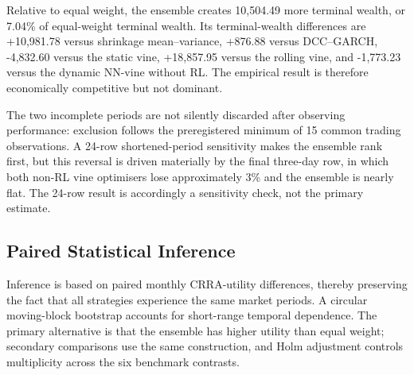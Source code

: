 Relative to equal weight, the ensemble creates 10,504.49 more terminal wealth, or 7.04\% of equal-weight terminal wealth. Its terminal-wealth differences are +10,981.78 versus shrinkage mean--variance, +876.88 versus DCC--GARCH, -4,832.60 versus the static vine, +18,857.95 versus the rolling vine, and -1,773.23 versus the dynamic NN-vine without RL. The empirical result is therefore economically competitive but not dominant.

The two incomplete periods are not silently discarded after observing performance: exclusion follows the preregistered minimum of 15 common trading observations. A 24-row shortened-period sensitivity makes the ensemble rank first, but this reversal is driven materially by the final three-day row, in which both non-RL vine optimisers lose approximately 3\% and the ensemble is nearly flat. The 24-row result is accordingly a sensitivity check, not the primary estimate.

\subsection{Paired Statistical Inference}
\label{subsec:4_inference}

Inference is based on paired monthly CRRA-utility differences, thereby preserving the fact that all strategies experience the same market periods. A circular moving-block bootstrap accounts for short-range temporal dependence. The primary alternative is that the ensemble has higher utility than equal weight; secondary comparisons use the same construction, and Holm adjustment controls multiplicity across the six benchmark contrasts.

\begin{table}[H]
\centering
\caption{Paired CRRA-Utility Effects of the TD3 Ensemble}
\label{tab:paired_inference}
\caption*{\footnotesize Notes: Effects are ensemble minus benchmark mean monthly CRRA utility. All intervals include zero. Seeds are not used as market replications.}
\end{table}

